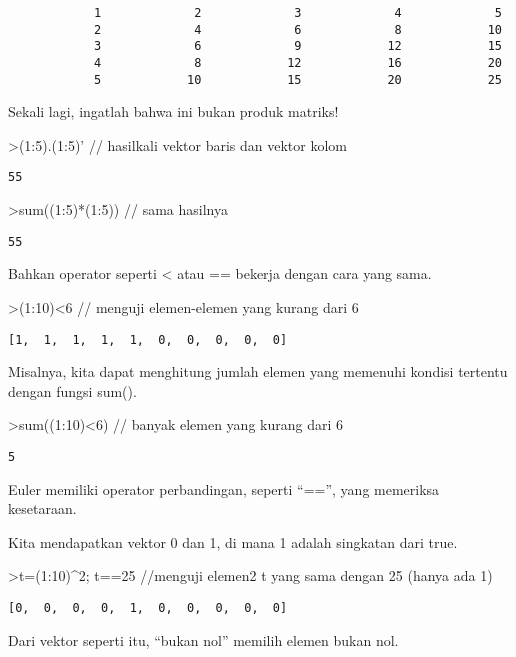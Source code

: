\documentclass[
]{book}
\begin{document}
\begin{verbatim}
            1             2             3             4             5 
            2             4             6             8            10 
            3             6             9            12            15 
            4             8            12            16            20 
            5            10            15            20            25 
\end{verbatim}

Sekali lagi, ingatlah bahwa ini bukan produk matriks!

\textgreater(1:5).(1:5)' // hasilkali vektor baris dan vektor kolom

\begin{verbatim}
55
\end{verbatim}

\textgreater sum((1:5)*(1:5)) // sama hasilnya

\begin{verbatim}
55
\end{verbatim}

Bahkan operator seperti \textless{} atau == bekerja dengan cara yang sama.

\textgreater(1:10)\textless6 // menguji elemen-elemen yang kurang dari 6

\begin{verbatim}
[1,  1,  1,  1,  1,  0,  0,  0,  0,  0]
\end{verbatim}

Misalnya, kita dapat menghitung jumlah elemen yang memenuhi kondisi tertentu dengan fungsi sum().

\textgreater sum((1:10)\textless6) // banyak elemen yang kurang dari 6

\begin{verbatim}
5
\end{verbatim}

Euler memiliki operator perbandingan, seperti ``=='', yang memeriksa kesetaraan.

Kita mendapatkan vektor 0 dan 1, di mana 1 adalah singkatan dari true.

\textgreater t=(1:10)\^{}2; t==25 //menguji elemen2 t yang sama dengan 25 (hanya ada 1)

\begin{verbatim}
[0,  0,  0,  0,  1,  0,  0,  0,  0,  0]
\end{verbatim}

Dari vektor seperti itu, ``bukan nol'' memilih elemen bukan nol.
\end{document}
